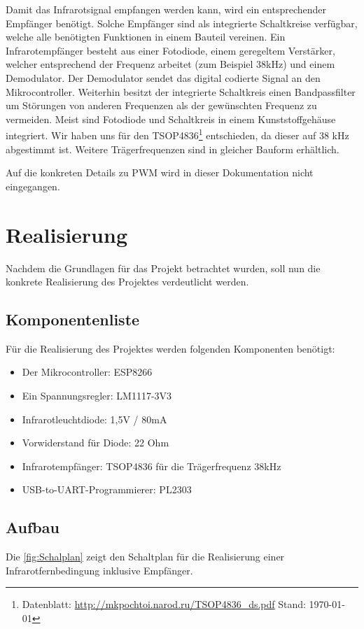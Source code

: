 Damit das Infrarotsignal empfangen werden kann, wird ein entsprechender Empfänger benötigt.
Solche Empfänger sind als integrierte Schaltkreise verfügbar, welche alle benötigten Funktionen in einem Bauteil vereinen.
Ein Infrarotempfänger besteht aus einer Fotodiode, einem geregeltem Verstärker, welcher entsprechend der Frequenz arbeitet (zum Beispiel 38kHz) und einem Demodulator.
Der Demodulator sendet das digital codierte Signal an den Mikrocontroller.
Weiterhin besitzt der integrierte Schaltkreis einen Bandpassfilter um Störungen von anderen Frequenzen als der gewünschten Frequenz zu vermeiden.
Meist sind Fotodiode und Schaltkreis in einem Kunststoffgehäuse integriert.
Wir haben uns für den TSOP4836\footnote{Datenblatt: \url{http://mkpochtoi.narod.ru/TSOP4836_ds.pdf} Stand: \today} entschieden, da dieser auf 38 kHz abgestimmt ist. Weitere Trägerfrequenzen sind in gleicher Bauform erhältlich.

Auf die konkreten Details zu PWM wird in dieser Dokumentation nicht eingegangen.

\section{Realisierung}
Nachdem die Grundlagen für das Projekt betrachtet wurden, soll nun die konkrete Realisierung des Projektes verdeutlicht werden.
\subsection{Komponentenliste}
Für die Realisierung des Projektes werden folgenden Komponenten benötigt:
\begin{itemize}
	\item Der Mikrocontroller: ESP8266
	\item Ein Spannungsregler: LM1117-3V3
	\item Infrarotleuchtdiode: 1,5V / 80mA
	\item Vorwiderstand für Diode: 22 Ohm
	\item Infrarotempfänger: TSOP4836 für die Trägerfrequenz 38kHz
	\item USB-to-UART-Programmierer: PL2303
\end{itemize}


\subsection{Aufbau}

Die \autoref{fig:Schalplan} zeigt den Schaltplan für die Realisierung einer Infrarotfernbedingung inklusive Empfänger.


